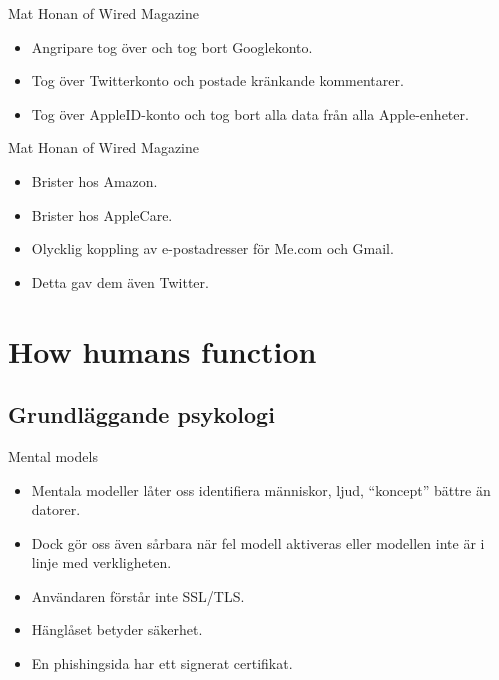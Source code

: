 \documentclass{beamer}
\begin{document}
\begin{frame}{Mat Honan of Wired Magazine}
  \begin{example}[Vad?]
    \begin{itemize}
      \item Angripare tog över och tog bort Googlekonto.
      \item Tog över Twitterkonto och postade kränkande kommentarer.
      \item Tog över AppleID-konto och tog bort alla data från alla 
        Apple-enheter.
    \end{itemize}
  \end{example}
\end{frame}

\begin{frame}{Mat Honan of Wired Magazine}
  \begin{example}[Hur?]
    \begin{itemize}
      \item Brister hos Amazon.
      \item Brister hos AppleCare.
      \item Olycklig koppling av e-postadresser för Me.com och Gmail.
      \item Detta gav dem även Twitter.
    \end{itemize}
  \end{example}
\end{frame}


\section{How humans function}

\subsection{Grundläggande psykologi}

\begin{frame}
  \begin{block}{Mental models}
    \begin{itemize}
      \item Mentala modeller låter oss identifiera människor, ljud, 
        \enquote{koncept} bättre än datorer.

      \item Dock gör oss även sårbara när fel modell aktiveras eller modellen 
        inte är i linje med verkligheten.
    \end{itemize}
  \end{block}

  \pause{}

  \begin{example}
    \begin{itemize}
      \item Användaren förstår inte SSL/TLS\@.
      \item Hänglåset betyder säkerhet.
      \item En phishingsida har ett signerat certifikat.
    \end{itemize}
  \end{example}
\end{frame}
\end{document}
